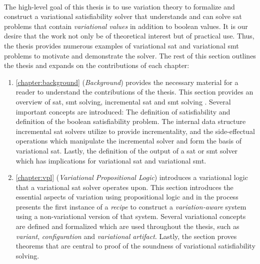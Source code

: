 ~\label{section:contributions}

The high-level goal of this thesis is to use variation theory to formalize and
construct a variational satisfiability solver that understands and can solve
\ac{sat} problems that contain \emph{variational values} in addition to boolean
values. It is our desire that the work not only be of theoretical interest but
of practical use. Thus, the thesis provides numerous examples of variational
\ac{sat} and variational \ac{smt} problems to motivate and demonstrate the
solver. The rest of this section outlines the thesis and expands on the
contributions of each chapter:

  \begin{enumerate}
  \item \autoref{chapter:background} (\emph{Background}) provides the necessary
    material for a reader to understand the contributions of the thesis. This
    section provides an overview of \acl{sat}, \acl{smt} solving, incremental
    \ac{sat} and \ac{smt} solving . Several important concepts are introduced:
    The definition of satisfiability and definition of the boolean
    satisfiability problem. The internal data structure incremental \ac{sat}
    solvers utilize to provide incrementality, and the side-effectual operations
    which manipulate the incremental solver and form the basis of variational
    \acl{sat}. Lastly, the definition of the output of a \ac{sat} or \ac{smt}
    solver which has implications for variational \acl{sat} and variational
    \ac{smt}.

  \item \autoref{chapter:vpl} (\emph{Variational Propositional Logic})
    introduces a variational logic that a variational \ac{sat} solver operates
    upon. This section introduces the essential aspects of variation using
    propositional logic and in the process presents the first instance of a
    \emph{\recipe{} recipe} to construct a \emph{variation-aware}
    system using a non-variational version of that system. Several variational
    concepts are defined and formalized which are used throughout the thesis,
    such as \emph{variant}, \emph{configuration} and \emph{variational
      artifact}. Lastly, the section proves theorems that are central to proof
    of the soundness of variational satisfiability solving.


\end{enumerate}
